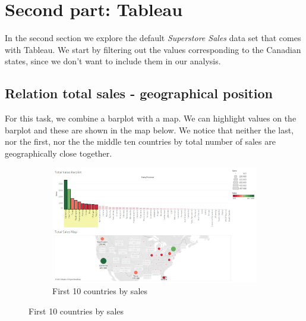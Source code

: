 \documentclass[openany]{article}
\begin{document}
\clearpage
\section {Second part: Tableau}

In the second section we explore the default \textit{Superstore Sales} data set that comes with Tableau.
We start by filtering out the values corresponding to the Canadian states, since we don't want to include them in our analysis.

\subsection {Relation total sales - geographical position}

For this task, we combine a barplot with a map.
We can highlight values on the barplot and these are shown in the map below.
We notice that neither the last, nor the first, nor the the middle ten countries by total number of sales are geographically close together.

\begin{figure}[h]
	\centering
	\begin{subfigure}{\textwidth}
		\centering
		\includegraphics[width=\linewidth]{Tableau/a_2}
		\caption{First 10 countries by sales}
	\end{subfigure}
\end{figure}
\end{document}
